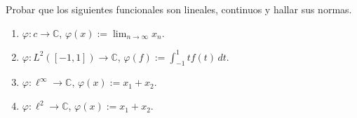 \documentclass{article}
\theoremstyle{definition}
\newcommand{\C}{\mathbb{C}}
\newenvironment{ejercicio}[1]{\begin{trivlist}
\item[\hskip \labelsep {\bfseries Ejercicio}\hskip \labelsep {\bfseries #1.}]}{\end{trivlist}}
\begin{document}
\vspace{0.5cm}

\begin{ejercicio}{3}
    Probar que los siguientes funcionales son lineales, continuos y hallar sus normas.
    \begin{enumerate}
        \item \( \varphi:c\to\C \), \(\varphi(x):=\displaystyle\lim_{n\to\infty}x_n\).
        \item \( \varphi:L^2([-1,1])\to\C \), \(\varphi(f):=\displaystyle\int_{-1}^1 tf(t)\,dt\).
        \item \( \varphi:\ell^\infty\to\C \), \(\varphi(x):=x_1+x_2\).
        \item \( \varphi:\ell^2\to\C \), \(\varphi(x):=x_1+x_2\).
    \end{enumerate}
\end{ejercicio}
\end{document}
